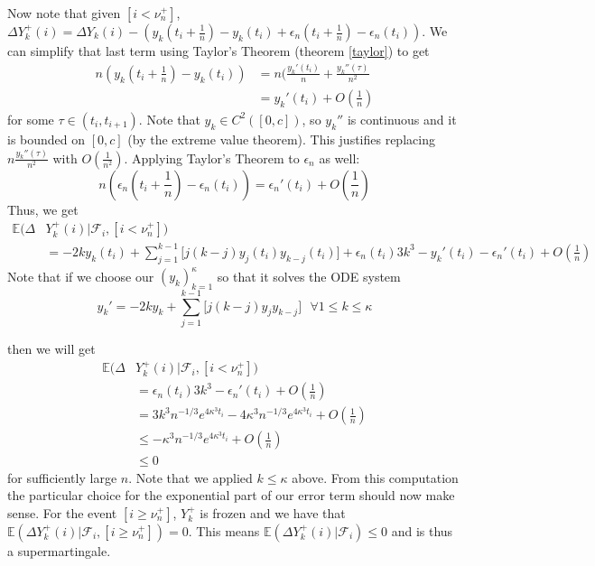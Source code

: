 Now note that given \([i < \nu_{n}^{+}]\), \(\Delta Y_{k}^{+}(i) = \Delta Y_{k}(i) - (y_{k}(t_{i} + \frac{1}{n}) - y_{k}(t_{i}) + \epsilon_{n}(t_{i} + \frac{1}{n}) - \epsilon_{n}(t_{i}))\). We can simplify that last term using Taylor's Theorem (theorem \ref{taylor}) to get
\begin{align*}
    n(y_{k}(t_{i} + \frac{1}{n}) - y_{k}(t_{i})) &= n(\frac{y_{k}'(t_{i})}{n} + \frac{y_{k}''(\tau)}{n^{2}} \\
    &= y_{k}'(t_{i}) + O(\frac{1}{n})
\end{align*}
for some \(\tau \in (t_{i}, t_{i+1})\). Note that \(y_{k} \in C^{2}([0, c])\), so \(y_{k}''\) is continuous and it is bounded on \([0, c]\) (by the extreme value theorem). This justifies replacing \(n\frac{y_{k}''(\tau)}{n^{2}}\) with \(O(\frac{1}{n^{2}})\). Applying Taylor's Theorem to \(\epsilon_{n}\) as well:
\[n(\epsilon_{n}(t_{i} + \frac{1}{n}) - \epsilon_{n}(t_{i})) = \epsilon_{n}'(t_{i}) + O(\frac{1}{n})\]
Thus, we get
\begin{align*}
    \mathbb{E}(\Delta &Y^{+}_{k}(i)|\mathcal{F}_{i}, [i < \nu_{n}^{+}]) \\
    &= -2 k y_{k}(t_{i}) + \sum\limits_{j=1}^{k-1} \Big[ j (k - j) y_{j}(t_{i})y_{k-j}(t_{i})\Big]  + \epsilon_{n}(t_{i}) 3 k^{3} - y_{k}'(t_{i}) - \epsilon_{n}'(t_{i}) + O(\frac{1}{n})
\end{align*}
Note that if we choose our \((y_{k})_{k=1}^{\kappa}\) so that it solves the ODE system
\[y_{k}' = -2 k y_{k} + \sum\limits_{j=1}^{k-1} \Big[ j (k - j) y_{j}y_{k-j}\Big] \text{ } \forall 1 \leq k \leq \kappa \]

then we will get 
\begin{align*}
    \mathbb{E}(\Delta &Y^{+}_{k}(i)|\mathcal{F}_{i}, [i < \nu_{n}^{+}]) \\
    &= \epsilon_{n}(t_{i}) 3 k^{3} - \epsilon_{n}'(t_{i}) + O(\frac{1}{n})\\
    &=  3 k^{3} n^{-1/3} e^{4 \kappa^{3}t_{i}} - 4 \kappa^{3} n^{-1/3} e^{4 \kappa^{3}t_{i}} + O(\frac{1}{n}) \\
    &\leq  -\kappa^{3} n^{-1/3} e^{4 \kappa^{3}t_{i}} + O(\frac{1}{n}) \\
    &\leq 0
\end{align*}
for sufficiently large \(n\). Note that we applied \(k \leq \kappa\) above. From this computation the particular choice for the exponential part of our error term should now make sense. For the event \([i \geq \nu_{n}^{+}]\), \(Y^{+}_{k}\) is frozen and we have that \(\mathbb{E}(\Delta Y^{+}_{k}(i)|\mathcal{F}_{i}, [i \geq \nu_{n}^{+}]) = 0\). This means \(\mathbb{E}(\Delta Y^{+}_{k}(i)|\mathcal{F}_{i})\leq 0\) and is thus a supermartingale.

